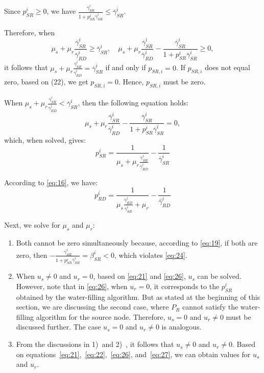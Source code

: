 \documentclass[lettersize,journal]{IEEEtran}
\begin{document}
	Since \( p_{SR}^i \geq 0 \), we have \( \frac{\overline{\gamma}_{SR}^i}{1 + p_{SR}^i \overline{\gamma}_{SR}^i} \leq \overline{\gamma}_{SR}^i \).
	
	Therefore, when
	\[
	\mu_s + \mu_r \frac{\overline{\gamma}_{SR}^i}{\overline{\gamma}_{RD}^i} \geq \overline{\gamma}_{SR}^i,
	\quad \mu_s + \mu_r \frac{\overline{\gamma}_{SR}^i}{\overline{\gamma}_{RD}^i} - \frac{\overline{\gamma}_{SR}^i}{1 + p_{SR}^i \overline{\gamma}_{SR}^i} \geq 0,
	\]
	it follows that \( \mu_s + \mu_r \frac{\overline{\gamma}_{SR}^i}{\overline{\gamma}_{RD}^i} = \overline{\gamma}_{SR}^i \) if and only if \( p_{SR,i} = 0 \). If \( p_{SR,i} \) does not equal zero, based on (22), we get \( p_{SR,i} = 0 \). Hence, \( p_{SR,i} \) must be zero.
	
	When \( \mu_s + \mu_r \frac{\overline{\gamma}_{SR}^i}{\overline{\gamma}_{RD}^i} < \overline{\gamma}_{SR}^i \), then the following equation holds:
	\[
	\mu_s + \mu_r \frac{\overline{\gamma}_{SR}^i}{\overline{\gamma}_{RD}^i} - \frac{\overline{\gamma}_{SR}^i}{1 + p_{SR}^i \overline{\gamma}_{SR}^i} = 0,
	\]
	which, when solved, gives:
	\begin{equation}
	p_{SR}^i = \frac{1}{\mu_s + \mu_r \frac{\overline{\gamma}_{SR}^i}{\overline{\gamma}_{RD}^i}} - \frac{1}{\overline{\gamma}_{SR}^i}
	\label{eq:26}
	\end{equation}
	
	According to \eqref{eq:16}, we have:
	\begin{equation}
		p_{RD}^i = \frac{1}{{{\mu _s}\frac{{\bar \gamma _{RD}^i}}{{\bar \gamma _{SR}^i}} + {\mu _r}}} - \frac{1}{{\bar \gamma _{RD}^i}}
		\label{eq:27}
	\end{equation}
	
	Next, we solve for \( \mu_s \) and \( \mu_r \):
	
	\begin{enumerate}
		\item Both cannot be zero simultaneously because, according to \eqref{eq:19}, if both are zero, then \( - \frac{{\bar \gamma _{SR}^i}}{{1 + p_{SR}^i\bar \gamma _{SR}^i}} = \beta _{SR}^i < 0 \), which violates \eqref{eq:24}.
		\item When \( u_s \neq 0 \) and \( u_r = 0 \), based on \eqref{eq:21} and \eqref{eq:26}, \( u_s \) can be solved. However, note that in \eqref{eq:26}, when \( u_r = 0 \), it corresponds to the \( p_{SR}^i \) obtained by the water-filling algorithm. But as stated at the beginning of this section, we are discussing the second case, where \( P_R \) cannot satisfy the water-filling algorithm for the source node. Therefore, \( u_s = 0 \) and \( u_r \neq 0 \) must be discussed further. The case \( u_s = 0 \) and \( u_r \neq 0 \) is analogous.
		\item From the discussions in 1)\ and 2)\ , it follows that \( u_s \neq 0 \) and \( u_r \neq 0 \). Based on equations~\eqref{eq:21},~\eqref{eq:22},~\eqref{eq:26}, and~\eqref{eq:27}, we can obtain values for \( u_s \) and \( u_r \).
	\end{enumerate}
	
\end{document}
